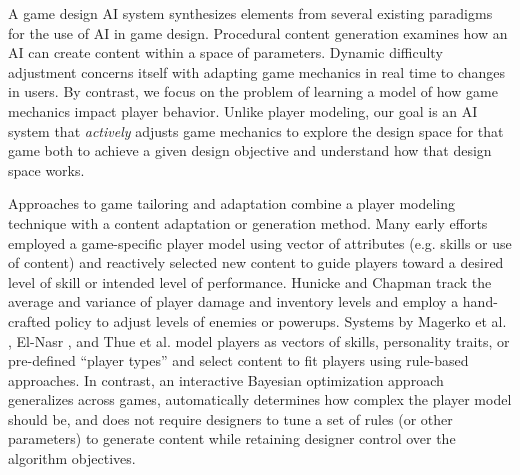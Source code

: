 \documentclass[letterpaper]{article}
\begin{document}
A game design AI system synthesizes elements from several existing paradigms for the use of AI in game design. Procedural content generation examines how an AI can create content within a space of parameters.  Dynamic difficulty adjustment concerns itself with adapting game mechanics in real time to changes in users. By contrast, we focus on the problem of learning a model of how game mechanics impact player behavior. 
Unlike player modeling, our goal is an AI system that {\em actively} adjusts game mechanics to explore the design space for that game both to achieve a given design objective and understand how that design space works. 


Approaches to game tailoring and adaptation combine a player modeling technique with a content adaptation or generation method. Many early efforts employed a game-specific player model using vector of attributes (e.g. skills or use of content) and reactively selected new content to guide players toward a desired level of skill or intended level of performance. Hunicke and Chapman  track the average and variance of player damage and inventory levels and employ a hand-crafted policy to adjust levels of enemies or powerups. 
Systems by Magerko et al. , El-Nasr , and Thue et al.  model players as vectors of skills, personality traits, or pre-defined ``player types'' and select content to fit players using rule-based approaches. In contrast, an interactive Bayesian optimization approach generalizes across games, automatically determines how complex the player model should be, and does not require designers to tune a set of rules (or other parameters) to generate content while retaining designer control over the algorithm objectives. 

\end{document}
